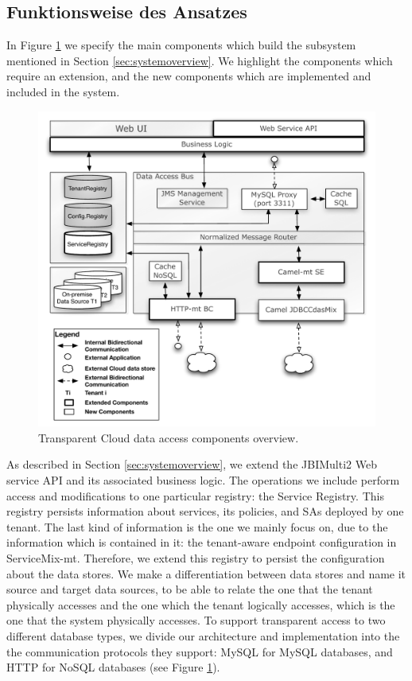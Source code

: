 \subsection{Funktionsweise des Ansatzes}
\label{subsec:FunktionsweiseAnsatz}

In Figure \ref{fig:componentoverview} we specify the main components which build the subsystem mentioned in Section \ref{sec:systemoverview}. We highlight the components which require an extension, and the new components which are implemented and included in the system. 

\begin{figure}[htb]
	\centering
		\includegraphics[clip, scale=0.6]{./gfx/componentoverview.pdf}
	\caption[Transparent Cloud Data Access Components Overview]{Transparent Cloud data access components overview.}
	\label{fig:componentoverview}
\end{figure}

As described in Section \ref{sec:systemoverview}, we extend the JBIMulti2 Web service \ac{API} and its associated business logic. The operations we include perform access and modifications to one particular registry: the Service Registry. This registry persists information about services, its policies, and \ac{SA}s deployed by one tenant. The last kind of information is the one we mainly focus on, due to the information which is contained in it: the tenant-aware endpoint configuration in ServiceMix-mt. Therefore, we extend this registry to persist the configuration about the data stores. We make a differentiation between data stores and name it source and target data sources, to be able to relate the one that the tenant physically accesses and the one which the tenant logically accesses, which is the one that the system physically accesses. To support transparent access to two different database types, we divide our architecture and implementation into the the communication protocols they support: MySQL for MySQL databases, and HTTP for \ac{NoSQL} databases (see Figure \ref{fig:componentoverview}). 

